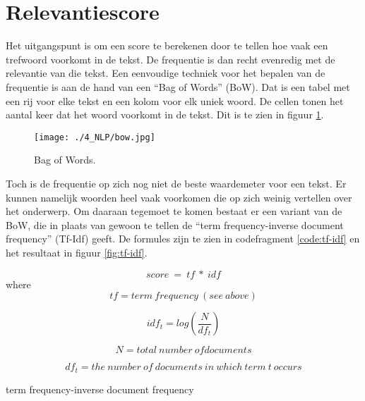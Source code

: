\section{Relevantiescore}
Het uitgangspunt is om een score te berekenen door te tellen hoe vaak een trefwoord voorkomt in de tekst. De frequentie is dan recht evenredig met de relevantie van die tekst. Een eenvoudige techniek voor het bepalen van de frequentie is aan de hand van een ``Bag of Words'' (BoW). Dat is een tabel met een rij voor elke tekst en een kolom voor elk uniek woord. De cellen tonen het aantal keer dat het woord voorkomt in de tekst.  Dit is te zien in figuur \ref{fig:bow}.
\begin{figure}
    \centering
    \texttt{[image: ./4\_NLP/bow.jpg]}
    \caption[Bag of Words.]{\label{fig:bow}Bag of Words.}
\end{figure}
Toch is de frequentie op zich nog niet de beste waardemeter voor een tekst. Er kunnen namelijk woorden heel vaak voorkomen die op zich weinig vertellen over het onderwerp. Om daaraan tegemoet te komen bestaat er een variant van de BoW, die in plaats van gewoon te tellen de ``term frequency-inverse document frequency'' (Tf-Idf) geeft. De formules zijn te zien in codefragment \ref{code:tf-idf} en het resultaat in figuur \ref{fig:tf-idf}.
\begin{listing}
    \begin{equation}
        score\ =\ tf\ \ast\ idf
    \end{equation}  
    where
    \begin{equation}
        tf=term\ frequency\ \left(see\ above\right)
    \end{equation} 
    
    \begin{equation}
        idf_t=log\left(\frac{N}{df_t}\right)
    \end{equation}  
    
    \begin{equation} 
        N=total\ number\ ofdocuments
    \end{equation}  
    
    \begin{equation} 
        df_t=the\ number\ of\ documents\ in\ which\ term\ t\ occurs
    \end{equation} 
     
    \caption[term frequency-inverse document frequency]{term frequency-inverse document frequency}
    \label{code:tf-idf}
\end{listing}
